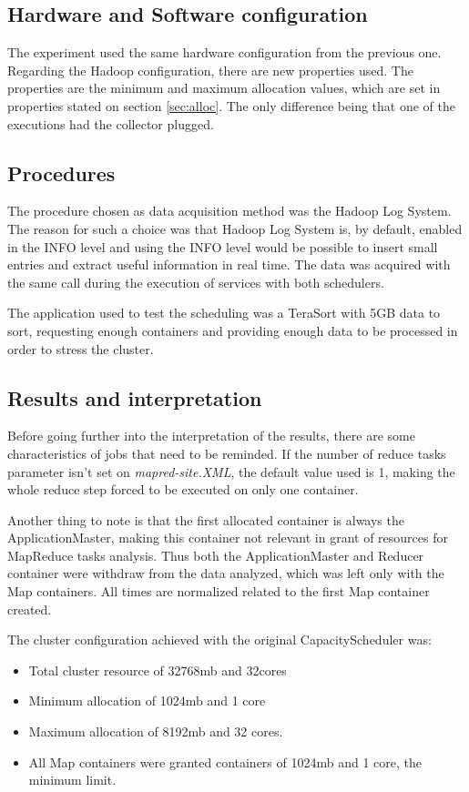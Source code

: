 \subsection{Hardware and Software configuration}
The experiment used the same hardware configuration from the previous one. Regarding the Hadoop configuration, there are new properties used. The properties are the minimum and maximum allocation values, which are set in properties stated on section \ref{sec:alloc}. The only difference being that one of the executions had the collector plugged.

\subsection{Procedures}
The procedure chosen as data acquisition method was the Hadoop Log System. The reason for such a choice was that Hadoop Log System is, by default, enabled in the INFO level and using the INFO level would be possible to insert small entries and extract useful information in real time. The data was acquired with the same call during the execution of services with both schedulers.

The application used to test the scheduling was a TeraSort with 5GB data to sort, requesting enough containers and providing enough data to be processed in order to stress the cluster.


\subsection{Results and interpretation}
Before going further into the interpretation of the results, there are some characteristics of jobs that need to be reminded. If the number of reduce tasks parameter isn't set on \textit{mapred-site.XML}, the default value used is 1, making the whole reduce step forced to be executed on only one container.

Another thing to note is that the first allocated container is always the ApplicationMaster, making this container not relevant in grant of resources for MapReduce tasks analysis. Thus both the ApplicationMaster and Reducer container were withdraw from the data analyzed, which was left only with the Map containers. All times are normalized related to the first Map container created.

The cluster configuration achieved with the original CapacityScheduler was: 
\begin{itemize}
	\item Total cluster resource of 32768mb and 32cores
	\item Minimum allocation of 1024mb and 1 core
	\item Maximum allocation of 8192mb and 32 cores.
	\item All Map containers were granted containers of 1024mb and 1 core, the minimum limit.
\end{itemize}


